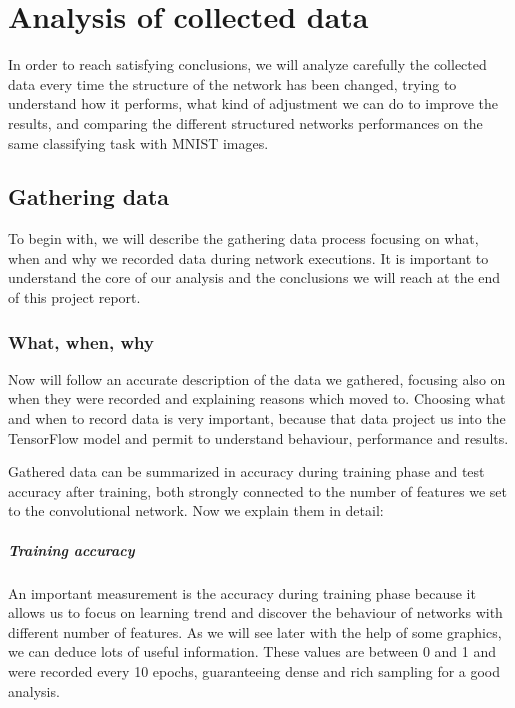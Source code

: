 \chapter{Analysis of collected data}\label{ch:data_analysis}

In order to reach satisfying conclusions, we will analyze carefully the collected data every time the structure of the network has been changed, trying to understand how it performs, what kind of adjustment we can do to improve the results, and comparing the different structured networks performances on the same classifying task with MNIST images.

\section{Gathering data}

To begin with, we will describe the gathering data process focusing on what, when and why we recorded data during network executions. It is important to understand the core of our analysis and the conclusions we will reach at the end of this project report.

\subsection{What, when, why}

Now will follow an accurate description of the data we gathered, focusing also on when they were recorded and explaining reasons which moved to. Choosing what and when to record data is very important, because that data project us into the TensorFlow model and permit to understand behaviour, performance and results.

Gathered data can be summarized in accuracy during training phase and test accuracy after training, both strongly connected to the number of features we set to the convolutional network. Now we explain them in detail:

\paragraph{Training accuracy}

An important measurement is the accuracy during training phase because it allows us to focus on learning trend and discover the behaviour of networks with different number of features. As we will see later with the help of some graphics, we can deduce lots of useful information. These values are between 0 and 1 and were recorded every 10 epochs, guaranteeing dense and rich sampling for a good analysis.

